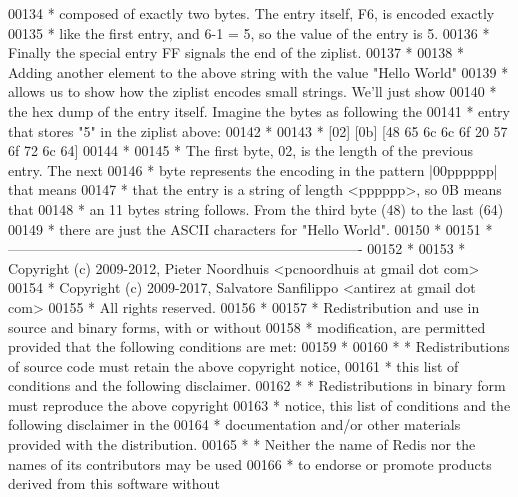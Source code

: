 \begin{DoxyCode}
00134 \textcolor{comment}{ * composed of exactly two bytes. The entry itself, F6, is encoded exactly}
00135 \textcolor{comment}{ * like the first entry, and 6-1 = 5, so the value of the entry is 5.}
00136 \textcolor{comment}{ * Finally the special entry FF signals the end of the ziplist.}
00137 \textcolor{comment}{ *}
00138 \textcolor{comment}{ * Adding another element to the above string with the value "Hello World"}
00139 \textcolor{comment}{ * allows us to show how the ziplist encodes small strings. We'll just show}
00140 \textcolor{comment}{ * the hex dump of the entry itself. Imagine the bytes as following the}
00141 \textcolor{comment}{ * entry that stores "5" in the ziplist above:}
00142 \textcolor{comment}{ *}
00143 \textcolor{comment}{ * [02] [0b] [48 65 6c 6c 6f 20 57 6f 72 6c 64]}
00144 \textcolor{comment}{ *}
00145 \textcolor{comment}{ * The first byte, 02, is the length of the previous entry. The next}
00146 \textcolor{comment}{ * byte represents the encoding in the pattern |00pppppp| that means}
00147 \textcolor{comment}{ * that the entry is a string of length <pppppp>, so 0B means that}
00148 \textcolor{comment}{ * an 11 bytes string follows. From the third byte (48) to the last (64)}
00149 \textcolor{comment}{ * there are just the ASCII characters for "Hello World".}
00150 \textcolor{comment}{ *}
00151 \textcolor{comment}{ * ----------------------------------------------------------------------------}
00152 \textcolor{comment}{ *}
00153 \textcolor{comment}{ * Copyright (c) 2009-2012, Pieter Noordhuis <pcnoordhuis at gmail dot com>}
00154 \textcolor{comment}{ * Copyright (c) 2009-2017, Salvatore Sanfilippo <antirez at gmail dot com>}
00155 \textcolor{comment}{ * All rights reserved.}
00156 \textcolor{comment}{ *}
00157 \textcolor{comment}{ * Redistribution and use in source and binary forms, with or without}
00158 \textcolor{comment}{ * modification, are permitted provided that the following conditions are met:}
00159 \textcolor{comment}{ *}
00160 \textcolor{comment}{ *   * Redistributions of source code must retain the above copyright notice,}
00161 \textcolor{comment}{ *     this list of conditions and the following disclaimer.}
00162 \textcolor{comment}{ *   * Redistributions in binary form must reproduce the above copyright}
00163 \textcolor{comment}{ *     notice, this list of conditions and the following disclaimer in the}
00164 \textcolor{comment}{ *     documentation and/or other materials provided with the distribution.}
00165 \textcolor{comment}{ *   * Neither the name of Redis nor the names of its contributors may be used}
00166 \textcolor{comment}{ *     to endorse or promote products derived from this software without}

\end{DoxyCode}
